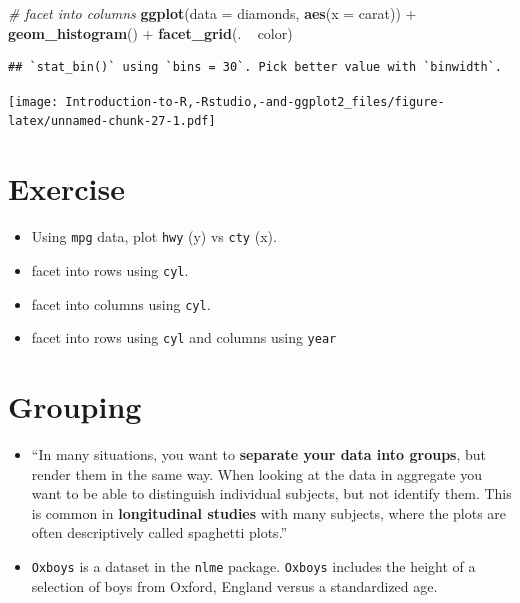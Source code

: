 \documentclass[]{book}
\newenvironment{Shaded}{\begin{snugshade}}{\end{snugshade}}
\newcommand{\KeywordTok}[1]{\textcolor[rgb]{0.13,0.29,0.53}{\textbf{{#1}}}}
\newcommand{\DataTypeTok}[1]{\textcolor[rgb]{0.13,0.29,0.53}{{#1}}}
\newcommand{\StringTok}[1]{\textcolor[rgb]{0.31,0.60,0.02}{{#1}}}
\newcommand{\CommentTok}[1]{\textcolor[rgb]{0.56,0.35,0.01}{\textit{{#1}}}}
\newcommand{\NormalTok}[1]{{#1}}
\begin{document}
\begin{Shaded}
\begin{Highlighting}[]
\CommentTok{# facet into columns}
\KeywordTok{ggplot}\NormalTok{(}\DataTypeTok{data =} \NormalTok{diamonds, }\KeywordTok{aes}\NormalTok{(}\DataTypeTok{x =} \NormalTok{carat)) +}\StringTok{ }\KeywordTok{geom_histogram}\NormalTok{() +}\StringTok{ }\KeywordTok{facet_grid}\NormalTok{(. ~}\StringTok{ }\NormalTok{color)}
\end{Highlighting}
\end{Shaded}

\begin{verbatim}
## `stat_bin()` using `bins = 30`. Pick better value with `binwidth`.
\end{verbatim}

\texttt{[image: Introduction-to-R,-Rstudio,-and-ggplot2\_files/figure-latex/unnamed-chunk-27-1.pdf]}

\section{Exercise}\label{exercise-2}

\begin{itemize}
\item
  Using \texttt{mpg} data, plot \texttt{hwy} (y) vs \texttt{cty} (x).
\item
  facet into rows using \texttt{cyl}.
\item
  facet into columns using \texttt{cyl}.
\item
  facet into rows using \texttt{cyl} and columns using \texttt{year}
\end{itemize}

\section{Grouping}\label{grouping}

\begin{itemize}
\item
  ``In many situations, you want to \textbf{separate your data into
  groups}, but render them in the same way. When looking at the data in
  aggregate you want to be able to distinguish individual subjects, but
  not identify them. This is common in \textbf{longitudinal studies}
  with many subjects, where the plots are often descriptively called
  spaghetti plots.'' \citep{ggplot2}
\item
  \texttt{Oxboys} is a dataset in the \texttt{nlme} package.
  \texttt{Oxboys} includes the height of a selection of boys from
  Oxford, England versus a standardized age.
\end{itemize}
\end{document}
